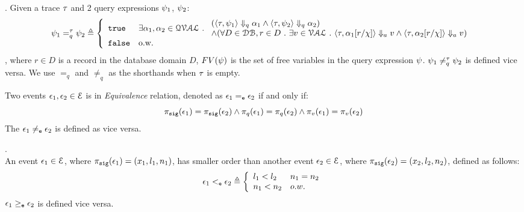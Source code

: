 %
\begin{defn}.
%
\label{def:query_equal}
Given a trace $\mathtt{\tau}$ and 2 query expressions $\psi_1$, $\psi_2$:
$$
\qexpr_1 =_{q}^{\trace} \qexpr_2 \triangleq
\left\{
  \begin{array}{ll} 
    \etrue      
    & 
  \exists \qval_1, \qval_2 \in \mathcal{QVAL} \st
  \begin{array}{l} 
    (\config{\trace,  \qexpr_1} \qarrow \qval_1 \land \config{\trace,  \qexpr_2 } \qarrow \qval_2) 
    \\
    \land (\forall D \in \dbdom, r \in D \st 
    \exists v \in \mathcal{VAL} \st 
          \config{\trace, \qval_1[r/\chi]} \aarrow v \land \config{\trace,  \qval_2[r/\chi] } \aarrow v)  
  \end{array}\\
    \efalse         
    & \text{o.w.} 
  \end{array}
  \right.
$$
%
, where $r \in D$ is a record in the database domain $D$, $FV(\psi)$ is the set of free variables in the query expression $\psi$.
$\psi_1 \neq_{q}^{\mathtt{\tau}} \psi_2$  is defined vice versa.
%
We use $=_{q}$  and $\neq_{q}$ as the shorthands when $\mathtt{\tau}$ is empty.
\end{defn}
%
\begin{defn}
Two events $\mathtt{\epsilon}_1, \mathtt{\epsilon}_2 \in \mathcal{E}$ is in \emph{Equivalence} relation, denoted as $\mathtt{\epsilon}_1 =_{\mathtt{e}} \mathtt{\epsilon}_2$ if and only if:
\[
\pi_{\mathtt{sig}}(\mathtt{\epsilon}_1) = \pi_{\mathtt{sig}}(\mathtt{\epsilon}_2) 
\land
\pi_{q}(\mathtt{\epsilon}_1) = \pi_{q}(\mathtt{\epsilon}_2)
\land
\pi_{v}(\mathtt{\epsilon}_1) = \pi_{v}(\mathtt{\epsilon}_2)
\]
%
The $\mathtt{\epsilon}_1 \neq_{\mathtt{e}} \mathtt{\epsilon}_2$ is defined as vice versa.
\end{defn}
%
%
%
\begin{defn}.
\label{def:query_dir}
\\
An event $\mathtt{\epsilon}_1 \in \mathcal{E}$, where $\pi_{\mathtt{sig}}(\mathtt{\epsilon}_1) = (x_1, l_1, n_1)$,
has smaller order than another event $\mathtt{\epsilon}_2 \in \mathcal{E}$, 
where 
$ \pi_{\mathtt{sig}}(\mathtt{\epsilon}_2) = (x_2, l_2, n_2)$, defined as follows:
%
\[
\event_1 \eventlt \event_2
\triangleq 
\left\{
\begin{array}{ll}
  l_1 < l_2 & n_1 = n_2
  \\
  n_1 < n_2  & o.w.
\end{array}  
\right.
\]
%
$\mathtt{\epsilon}_1 \geq_{\mathtt{e}} \mathtt{\epsilon}_2$  is defined vice versa.
\end{defn}
%
%